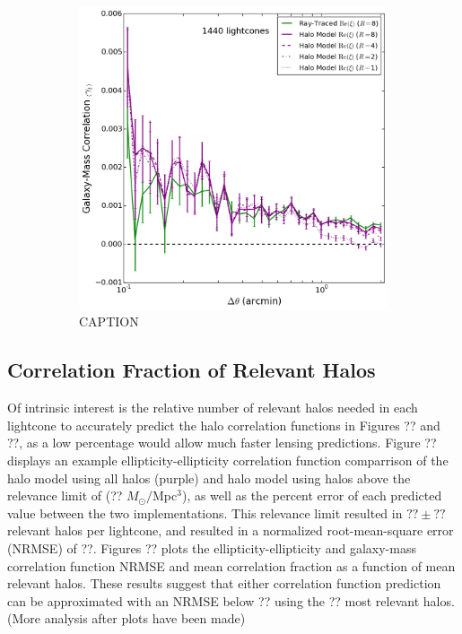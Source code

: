 \documentclass[%
 reprint,
 amsmath,amssymb,
 aps,nofootinbib
]{revtex4-1}
\begin{document}
\begin{figure}
\begin{subfigure}{0.475\textwidth}
        \includegraphics[width=\textwidth]{figs-swe/thesis/ng_progression.png}
        \captionsetup{justification=raggedright,singlelinecheck=false}
        \caption{CAPTION}
        \label{gg_corr_series}
    \end{subfigure}
    \caption{}
\end{figure}
%

\subsection{Correlation Fraction of Relevant Halos} \label{halo_fraction}

Of intrinsic interest is the relative number of relevant halos needed in each lightcone to accurately predict the halo correlation functions in Figures ?? and ??, as a low percentage would allow much faster lensing predictions. Figure ?? displays an example ellipticity-ellipticity correlation function comparrison of the halo model using all halos (purple) and halo model using halos above the relevance limit of (?? $M_{\odot}/$Mpc$^3$), as well as the percent error of each predicted value between the two implementations. This relevance limit resulted in $??\pm??$ relevant halos per lightcone, and resulted in a normalized root-mean-square error (NRMSE) of ??. Figures ?? plots the ellipticity-ellipticity and galaxy-mass correlation function NRMSE and mean correlation fraction as a function of mean relevant halos. These results suggest that either correlation function prediction can be approximated with an NRMSE below ?? using the ?? most relevant halos. (More analysis after plots have been made)
\end{document}
